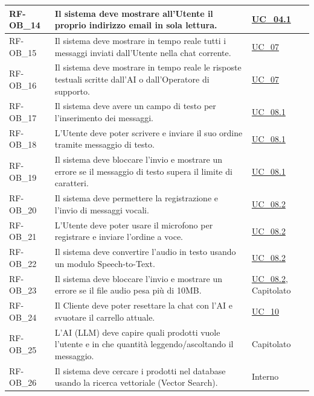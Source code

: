 \begin{longtable}{|>{\raggedright}p{}|>{\raggedright\arraybackslash}p{}|>{\raggedright\arraybackslash}p{}|}
    \hline
    RF-OB\_14 \hypertarget{rf-ob_14} & Il sistema deve mostrare all'Utente il proprio indirizzo email in sola lettura. & \hyperref[uc_04.1]{UC\_04.1} \\
    \hline
    RF-OB\_15 \hypertarget{rf-ob_15} & Il sistema deve mostrare in tempo reale tutti i messaggi inviati dall'Utente nella chat corrente. & \hyperref[uc_07]{UC\_07} \\
    \hline
    RF-OB\_16 \hypertarget{rf-ob_16} & Il sistema deve mostrare in tempo reale le risposte testuali scritte dall'AI o dall'Operatore di supporto. & \hyperref[uc_07]{UC\_07} \\
    \hline
    RF-OB\_17 \hypertarget{rf-ob_17} & Il sistema deve avere un campo di testo per l'inserimento dei messaggi. & \hyperref[uc_08.1]{UC\_08.1} \\
    \hline
    RF-OB\_18 \hypertarget{rf-ob_18} & L'Utente deve poter scrivere e inviare il suo ordine tramite messaggio di testo. & \hyperref[uc_08.1]{UC\_08.1} \\
    \hline
    RF-OB\_19 \hypertarget{rf-ob_19} & Il sistema deve bloccare l'invio e mostrare un errore se il messaggio di testo supera il limite di caratteri. & \hyperref[uc_08.1]{UC\_08.1} \\
    \hline
    RF-OB\_20 \hypertarget{rf-ob_20} & Il sistema deve permettere la registrazione e l'invio di messaggi vocali. & \hyperref[uc_08.2]{UC\_08.2} \\
    \hline
    RF-OB\_21 \hypertarget{rf-ob_21} & L'Utente deve poter usare il microfono per registrare e inviare l'ordine a voce. & \hyperref[uc_08.2]{UC\_08.2} \\
    \hline
    RF-OB\_22 \hypertarget{rf-ob_22} & Il sistema deve convertire l'audio in testo usando un modulo Speech-to-Text. & \hyperref[uc_08.2]{UC\_08.2} \\
    \hline
    RF-OB\_23 \hypertarget{rf-ob_23} & Il sistema deve bloccare l'invio e mostrare un errore se il file audio pesa più di 10MB. & \hyperref[uc_08.2]{UC\_08.2}, Capitolato \\
    \hline
    RF-OB\_24 \hypertarget{rf-ob_24} & Il Cliente deve poter resettare la chat con l'AI e svuotare il carrello attuale. & \hyperref[uc_10]{UC\_10} \\
    \hline
    RF-OB\_25 \hypertarget{rf-ob_25} & L'AI (LLM) deve capire quali prodotti vuole l'utente e in che quantità leggendo/ascoltando il messaggio. & Capitolato \\
    \hline
    RF-OB\_26 \hypertarget{rf-ob_26} & Il sistema deve cercare i prodotti nel database usando la ricerca vettoriale (Vector Search). & Interno \\

\end{longtable}
